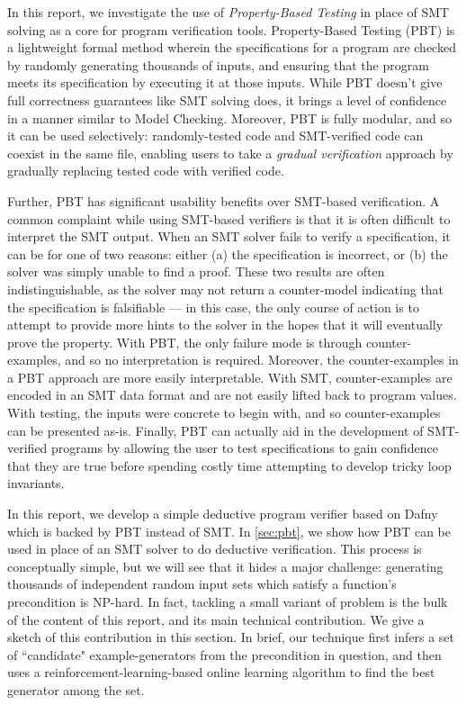 \documentclass[sigconf,nonacm]{acmart}
\begin{document}
In this report, we investigate the use of \textit{Property-Based Testing} in place of SMT solving as a core for program verification tools. Property-Based Testing (PBT) \cite{qc} is a lightweight formal method wherein the specifications for a program are checked by randomly generating thousands of inputs, and ensuring that the program meets its specification by executing it at those inputs. While PBT doesn't give full correctness guarantees like SMT solving does, it brings a level of confidence in a manner similar to Model Checking. Moreover, PBT is fully modular, and so it can be used selectively: randomly-tested code and SMT-verified code can coexist in the same file, enabling users to take a \textit{gradual verification} approach by gradually replacing tested code with verified code.

Further, PBT has significant usability benefits over SMT-based verification. A common complaint while using SMT-based verifiers is that it is often difficult to interpret the SMT output. When an SMT solver fails to verify a specification, it can be for one of two reasons: either (a) the specification is incorrect, or (b) the solver was simply unable to find a proof. These two results are often indistinguishable, as the solver may not return a counter-model indicating that the specification is falsifiable --- in this case, the only course of action is to attempt to provide more hints to the solver in the hopes that it will eventually prove the property. With PBT, the only failure mode is through counter-examples, and so no interpretation is required. Moreover, the counter-examples in a PBT approach are more easily interpretable. With SMT, counter-examples are encoded in an SMT data format and are not easily lifted back to program values. With testing, the inputs were concrete to begin with, and so counter-examples can be presented as-is. Finally, PBT can actually aid in the development of SMT-verified programs by allowing the user to test specifications to gain confidence that they are true before spending costly time attempting to develop tricky loop invariants.

In this report, we develop a simple deductive program verifier based on Dafny which is backed by PBT instead of SMT. In \autoref{sec:pbt}, we show how PBT can be used in place of an SMT solver to do deductive verification. This process is conceptually simple, but we will see that it hides a major challenge: generating thousands of independent random input sets which satisfy a function's precondition is NP-hard. In fact, tackling a small variant of problem is the bulk of the content of this report, and its main technical contribution. We give a sketch of this contribution in this section. In brief, our technique first infers a set of ``candidate" example-generators from the precondition in question, and then uses a reinforcement-learning-based online learning algorithm to find the best generator among the set.
\end{document}
